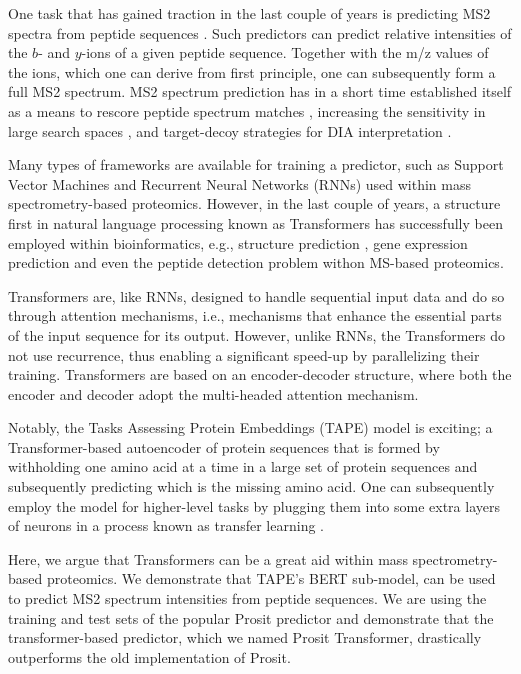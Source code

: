\documentclass[10pt,a4paper]{article}
\begin{document}
One task that has gained traction in the last couple of years is predicting MS2 spectra from peptide sequences \cite{Degroeve2015-fh,Gessulat2019-el}. Such predictors can predict relative intensities of the $b$- and $y$-ions of a given peptide sequence. Together with the m/z values of the ions, which one can derive from first principle, one can subsequently form a full MS2 spectrum. MS2 spectrum prediction has in a short time established itself as a means to rescore peptide spectrum matches \cite{C_Silva2019-ja}, increasing the sensitivity in large search spaces \cite{Wilhelm2021-mz}, and target-decoy strategies for DIA interpretation \cite{Searle2020-yk}.

Many types of frameworks are available for training a predictor, such as Support Vector Machines and Recurrent Neural Networks (RNNs) used within mass spectrometry-based proteomics. However, in the last couple of years, a structure first in natural language processing \cite{devlin2018bert} known as Transformers \cite{Vaswani2017-sy} has successfully been employed within bioinformatics, e.g., structure prediction \cite{Rao2019-qq,Bepler2021-ci}, gene expression prediction\cite{avsec2021effective} and even the peptide detection problem withon MS-based proteomics\cite{cheng2021pepformer}.

Transformers are, like RNNs, designed to handle sequential input data and do so through attention mechanisms, i.e., mechanisms that enhance the essential parts of the input sequence for its output. However, unlike RNNs, the Transformers do not use recurrence, thus enabling a significant speed-up by parallelizing their training. Transformers are based on an encoder-decoder structure, where both the encoder and decoder adopt the multi-headed attention mechanism\cite{Vaswani2017-sy}.

Notably, the Tasks Assessing Protein Embeddings (TAPE) model \cite{Rao2019-qq} is exciting; a Transformer-based autoencoder of protein sequences that is formed by withholding one amino acid at a time in a large set of protein sequences and subsequently predicting which is the missing amino acid. One can subsequently employ the model for higher-level tasks by plugging them into some extra layers of neurons in a process known as transfer learning \cite{Rao2019-qq,Bepler2021-ci}.

Here, we argue that Transformers can be a great aid within mass spectrometry-based proteomics. We demonstrate that TAPE’s BERT sub-model, can be used to predict MS2 spectrum intensities from peptide sequences. We are using the training and test sets of the popular Prosit \cite{Gessulat2019-el} predictor and demonstrate that the transformer-based predictor, which we named Prosit Transformer, drastically outperforms the old implementation of Prosit.
\end{document}
